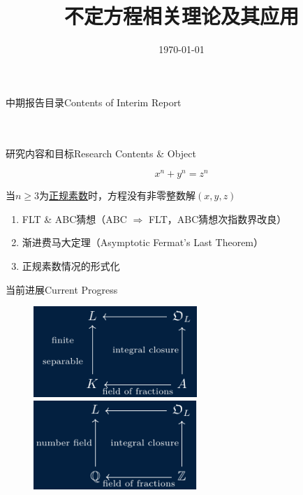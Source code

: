 \documentclass[aspectratio=169]{beamer}
\title{\Large{\bfseries{不定方程相关理论及其应用}}}
\date{\scriptsize{\today}}
\author{\small{\fangsong{郑欢誉}}}
\begin{document}
	
	\begin{frame}
		\titlepage
	\end{frame}
    
   	\begin{frame}{中期报告目录}{\small{Contents of Interim Report}}
       \\
       \\
       \\
   	\end{frame}
	
	\begin{frame}{研究内容和目标}{Research Contents \& Object}
        \begin{framed}
		$$
        x^n + y^n = z^n
        $$
        \begin{center}
            当$n \geq 3$为\underline{正规素数}时，方程没有非零整数解$(x, y, z)$
        \end{center}
        \end{framed}
        \begin{enumerate}
        \item FLT \& ABC猜想（ABC $\Longrightarrow$ FLT，ABC猜想次指数界改良）
        \item 渐进费马大定理（Asymptotic Fermat's Last Theorem）
        \item 正规素数情况的形式化
        \end{enumerate}
	\end{frame}
	
	\begin{frame}{当前进展}{Current Progress}
        \begin{figure}[htpb]
        \centering
        \begin{minipage}{0.49\linewidth}
        \includegraphics[width=6.2cm]{dia1.pdf}
        \end{minipage}
        \begin{minipage}{0.49\linewidth}
        \includegraphics[width=6.2cm]{dia2.pdf}
        \end{minipage}
        \end{figure}
	\end{frame}
    
\end{document}
